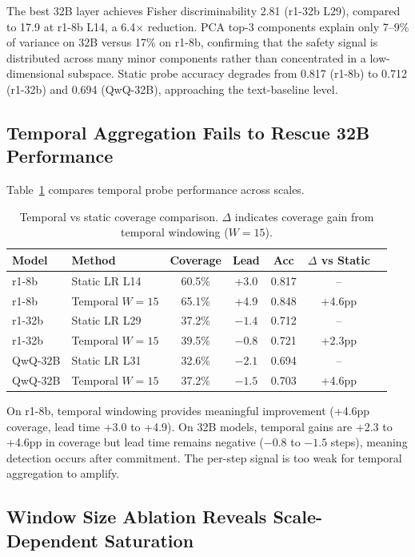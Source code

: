 \documentclass[11pt]{article}
\begin{document}
The best 32B layer achieves Fisher discriminability 2.81 (r1-32b L29), compared to 17.9 at r1-8b L14, a 6.4$\times$ reduction. PCA top-3 components explain only 7--9\% of variance on 32B versus 17\% on r1-8b, confirming that the safety signal is distributed across many minor components rather than concentrated in a low-dimensional subspace. Static probe accuracy degrades from 0.817 (r1-8b) to 0.712 (r1-32b) and 0.694 (QwQ-32B), approaching the text-baseline level.

\subsection{Temporal Aggregation Fails to Rescue 32B Performance}

Table~\ref{tab:temporal} compares temporal probe performance across scales.

\begin{table}[h]
\centering
\caption{Temporal vs static coverage comparison. $\Delta$ indicates coverage gain from temporal windowing ($W{=}15$).}
\label{tab:temporal}
\small
\begin{tabular}{llccccc}
\toprule
Model & Method & Coverage & Lead & Acc & $\Delta$ vs Static \\
\midrule
r1-8b & Static LR L14 & 60.5\% & +3.0 & 0.817 & -- \\
r1-8b & Temporal $W{=}15$ & 65.1\% & +4.9 & 0.848 & +4.6pp \\
\midrule
r1-32b & Static LR L29 & 37.2\% & $-1.4$ & 0.712 & -- \\
r1-32b & Temporal $W{=}15$ & 39.5\% & $-0.8$ & 0.721 & +2.3pp \\
\midrule
QwQ-32B & Static LR L31 & 32.6\% & $-2.1$ & 0.694 & -- \\
QwQ-32B & Temporal $W{=}15$ & 37.2\% & $-1.5$ & 0.703 & +4.6pp \\
\bottomrule
\end{tabular}
\end{table}

On r1-8b, temporal windowing provides meaningful improvement (+4.6pp coverage, lead time +3.0 to +4.9). On 32B models, temporal gains are +2.3 to +4.6pp in coverage but lead time remains negative ($-0.8$ to $-1.5$ steps), meaning detection occurs after commitment. The per-step signal is too weak for temporal aggregation to amplify.

\subsection{Window Size Ablation Reveals Scale-Dependent Saturation}
\end{document}
